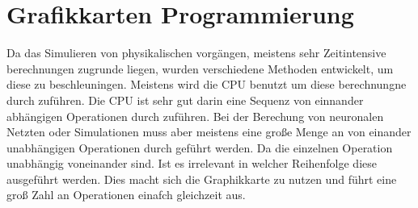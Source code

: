 
\section{Grafikkarten Programmierung} \label{sec:gpu}

Da das Simulieren von physikalischen vorgängen, 
meistens sehr Zeitintensive berechnungen zugrunde liegen, 
wurden verschiedene Methoden entwickelt, 
um diese zu beschleuningen.
Meistens wird die CPU benutzt um diese berechnungne durch zuführen.
Die CPU ist sehr gut darin eine Sequenz von einnander abhängigen Operationen durch zuführen.
Bei der Berechung von neuronalen Netzten oder Simulationen muss aber meistens eine große Menge 
an von einander unabhängigen Operationen durch geführt werden.
Da die einzelnen Operation unabhängig voneinander sind.
Ist es irrelevant in welcher Reihenfolge diese ausgeführt werden.
Dies macht sich die Graphikkarte zu nutzen und führt eine groß Zahl an Operationen einafch gleichzeit aus.






% 